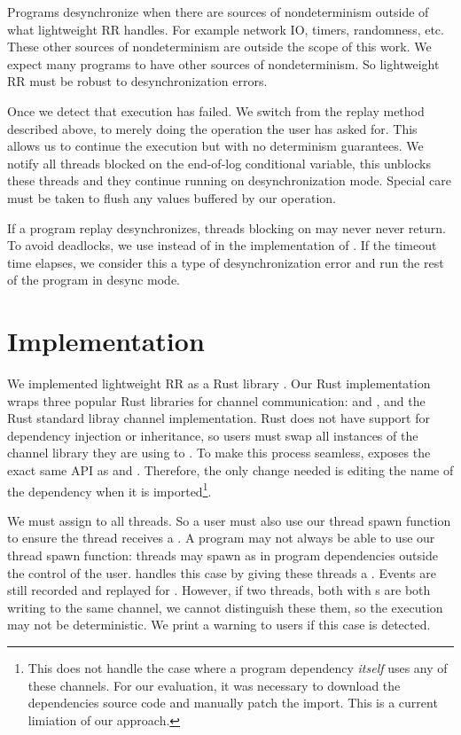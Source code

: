 Programs desynchronize when there are sources of nondeterminism outside of what lightweight
RR handles. For example network IO, timers, randomness, etc. These
other sources of nondeterminism are outside the scope of this work. We expect many
programs to have other sources of nondeterminism. So lightweight RR must be robust to
desynchronization errors.

Once we detect that execution has failed. We switch from the replay method described
above, to merely doing the operation the user has asked for. This allows us to
continue the execution but with no determinism guarantees. We notify all threads
blocked on the end-of-log conditional variable, this unblocks these threads and
they continue running on desynchronization mode. Special care must be taken to
flush any values buffered by our  operation.

If a program replay desynchronizes, threads blocking on  may never never
return. To avoid deadlocks, we use  instead of 
in the implementation of . If the timeout time elapses, we consider this
a type of desynchronization error and run the rest of the program in desync mode.

\section{Implementation}
We implemented lightweight RR as a Rust library . Our Rust implementation wraps three popular Rust libraries
for channel communication:  and , and the Rust standard libray channel implementation. Rust does not have
support for dependency injection or inheritance, so users must swap all instances of the
channel library they are using to . To make this process seamless,
 exposes the exact same API as  and
. Therefore, the only change needed is editing the name of the
dependency when it is imported\footnote{This does not handle the case where a program dependency \textit{itself} uses any of these channels. For our evaluation, it was necessary to download the dependencies source code and manually patch the import. This is a current limiation of our approach.}.

We must assign  to all threads. So a user must also use our
 thread spawn function to ensure the thread receives a . A
program may not always be able to use our thread spawn function: threads may spawn as in
program dependencies outside the control of the user.  handles this
case by giving these threads
a  . Events are still recorded and replayed for 
. However, if two threads, both with  s are both
writing to the same channel, we cannot distinguish these them, so the execution may not
be deterministic. We print a warning to users if this case is detected.

